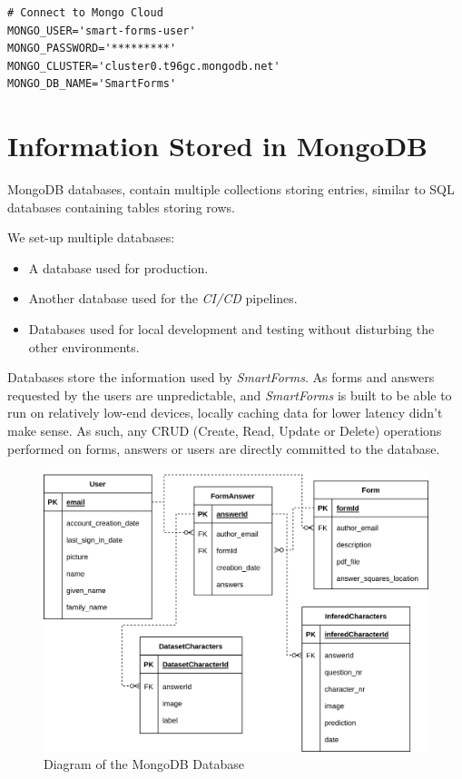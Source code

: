 \documentclass[11pt, a4paper]{report}
\begin{document}
\begin{verbatim}
# Connect to Mongo Cloud
MONGO_USER='smart-forms-user'
MONGO_PASSWORD='*********'
MONGO_CLUSTER='cluster0.t96gc.mongodb.net'
MONGO_DB_NAME='SmartForms'
\end{verbatim}

\section{Information Stored in MongoDB}

MongoDB databases, contain multiple collections storing entries, similar to SQL databases containing tables storing rows.

We set-up multiple databases:
\begin{itemize}
    \item A database used for production.
    \item Another database used for the \textit{CI/CD} pipelines.
    \item Databases used for local development and testing without disturbing the other environments. 
\end{itemize}

Databases store the information used by \textit{SmartForms}. As forms and answers requested by the users are unpredictable, and \textit{SmartForms} is built to be able to run on relatively low-end devices, locally caching data for lower latency didn't make sense. As such, any CRUD (Create, Read, Update or Delete) operations performed on forms, answers or users are directly committed to the database.


\begin{figure}[!h]
    \centering
    \includegraphics[width=35em]{images/diagrams/ER_diagram.png}
    \caption{Diagram of the MongoDB Database}
    \label{fig:label}
\end{figure}
\end{document}
